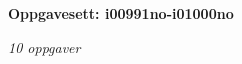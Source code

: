\centerline{\bf Oppgavesett: i00991no-i01000no}
\vskip 10pt
\centerline{\it 10 oppgaver}\vskip 10pt
\vskip 10pt
